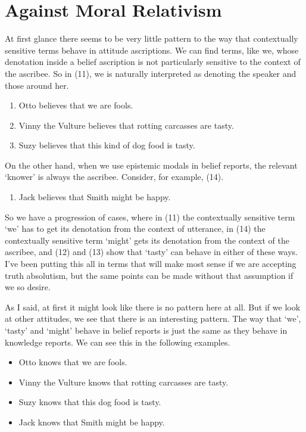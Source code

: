 \documentclass[
  10pt,
  letterpaper,
  DIV=11,
  numbers=noendperiod,
  twoside]{scrartcl}
\providecommand{\tightlist}{%
  \setlength{\itemsep}{0pt}\setlength{\parskip}{0pt}}\usepackage{longtable,booktabs,array}
\begin{document}
\section{Against Moral Relativism}\label{against-moral-relativism}

At first glance there seems to be very little pattern to the way that
contextually sensitive terms behave in attitude ascriptions. We can find
terms, like we, whose denotation inside a belief ascription is not
particularly sensitive to the context of the ascribee. So in (11), we is
naturally interpreted as denoting the speaker and those around her.

\begin{enumerate}
\def\labelenumi{\arabic{enumi}.}
\setcounter{enumi}{10}
\tightlist
\item
  Otto believes that we are fools.
\item
  Vinny the Vulture believes that rotting carcasses are tasty.
\item
  Suzy believes that this kind of dog food is tasty.
\end{enumerate}

On the other hand, when we use epistemic modals in belief reports, the
relevant `knower' is always the ascribee. Consider, for example, (14).

\begin{enumerate}
\def\labelenumi{\arabic{enumi}.}
\setcounter{enumi}{13}
\tightlist
\item
  Jack believes that Smith might be happy.
\end{enumerate}

So we have a progression of cases, where in (11) the contextually
sensitive term `we' has to get its denotation from the context of
utterance, in (14) the contextually sensitive term `might' gets its
denotation from the context of the ascribee, and (12) and (13) show that
`tasty' can behave in either of these ways. I've been putting this all
in terms that will make most sense if we are accepting truth absolutism,
but the same points can be made without that assumption if we so desire.

As I said, at first it might look like there is no pattern here at all.
But if we look at other attitudes, we see that there is an interesting
pattern. The way that `we', `tasty' and `might' behave in belief reports
is just the same as they behave in knowledge reports. We can see this in
the following examples.

\begin{itemize}
\tightlist
\item
  Otto knows that we are fools.
\item
  Vinny the Vulture knows that rotting carcasses are tasty.
\item
  Suzy knows that this dog food is tasty.
\item
  Jack knows that Smith might be happy.
\end{itemize}
\end{document}
